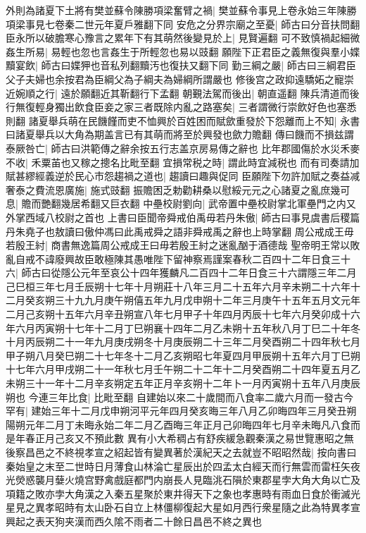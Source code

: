 外則為諸夏下土將有樊並蘇令陳勝項梁奮臂之禍|{
	樊並蘇令事見上卷永始三年陳勝項梁事見七卷秦二世元年夏戶雅翻下同}
安危之分界宗廟之至憂|{
	師古曰分音扶問翻}
臣永所以破膽寒心豫言之累年下有其萌然後變見於上|{
	見賢遍翻}
可不致慎禍起細微姦生所易|{
	易輕也忽也言姦生于所輕忽也易以豉翻}
願陛下正君臣之義無復與羣小媟黷宴飲|{
	師古曰媟狎也音私列翻黷汚也復扶又翻下同}
勤三綱之嚴|{
	師古曰三綱君臣父子夫婦也余按君為臣綱父為子綱夫為婦綱所謂嚴也}
修後宫之政抑遠驕妬之寵崇近婉順之行|{
	遠於願翻近其靳翻行下孟翻}
朝覲法駕而後出|{
	朝直遥翻}
陳兵清道而後行無復輕身獨出飲食臣妾之家三者既除内亂之路塞矣|{
	三者謂微行崇飲好色也塞悉則翻}
諸夏舉兵萌在民饑饉而吏不恤興於百姓困而賦歛重發於下怨離而上不知|{
	永書曰諸夏舉兵以大角為期盖言已有其萌而將至於興發也歛力贍翻}
傳曰饑而不損兹謂泰厥咎亡|{
	師古曰洪範傳之辭余按五行志盖京房易傳之辭也}
比年郡國傷於水災禾麥不收|{
	禾粟苖也又稼之摠名比毗至翻}
宜損常税之時|{
	謂此時宜減税也}
而有司奏請加賦甚繆經義逆於民心市怨趨禍之道也|{
	趨讀曰趣與促同}
臣願陛下勿許加賦之奏益减奢泰之費流恩廣施|{
	施式豉翻}
振贍困乏勅勸耕桑以慰綏元元之心諸夏之亂庶幾可息|{
	贍而艷翻幾居希翻又巨衣翻}
中壘校尉劉向|{
	武帝置中壘校尉掌北軍壘門之内又外掌西域八校尉之首也}
上書曰臣聞帝舜戒伯禹毋若丹朱傲|{
	師古曰事見虞書后稷篇丹朱堯子也敖讀曰傲仲馮曰此禹戒舜之語非舜戒禹之辭也上時掌翻}
周公戒成王毋若殷王紂|{
	商書無逸篇周公戒成王曰毋若殷王紂之迷亂酗于酒德哉}
聖帝明王常以敗亂自戒不諱廢興故臣敢極陳其愚唯陛下留神察焉謹案春秋二百四十二年日食三十六|{
	師古曰從隱公元年至哀公十四年獲麟凡二百四十二年日食三十六謂隱三年二月己巳桓三年七月壬辰朔十七年十月朔莊十八年三月二十五年六月辛未朔二十六年十二月癸亥朔三十九九月庚午朔僖五年九月戊申朔十二年三月庚午十五年五月文元年二月己亥朔十五年六月辛丑朔宣八年七月甲子十年四月丙辰十七年六月癸卯成十六年六月丙寅朔十七年十二月丁巳朔襄十四年二月乙未朔十五年秋八月丁巳二十年冬十月丙辰朔二十一年九月庚戌朔冬十月庚辰朔二十三年二月癸酉朔二十四年秋七月甲子朔八月癸巳朔二十七年冬十二月乙亥朔昭七年夏四月甲辰朔十五年六月丁巳朔十七年六月甲戌朔二十一年秋七月壬午朔二十二年十二月癸酉朔二十四年夏五月乙未朔三十一年十二月辛亥朔定五年正月辛亥朔十二年卜一月丙寅朔十五年八月庚辰朔也}
今連三年比食|{
	比毗至翻}
自建始以來二十歲間而八食率二歲六月而一發古今罕有|{
	建始三年十二月戊申朔河平元年四月癸亥晦三年八月乙卯晦四年三月癸丑朔陽朔元年二月丁未晦永始二年二月乙酉晦三年正月己卯晦四年七月辛未晦凡八食而是年春正月己亥又不預此數}
異有小大希稠占有舒疾緩急觀秦漢之易世覽惠昭之無後察昌邑之不終視孝宣之紹起皆有變異著於漢紀天之去就豈不昭昭然哉|{
	按向書曰秦始皇之末至二世時日月薄食山林淪亡星辰出於四孟太白經天而行無雲而雷枉矢夜光熒惑襲月㜸火燒宫野禽戲庭都門内崩長人見臨洮石隕於東郡星孛大角大角以亡及項籍之敗亦孛大角漢之入秦五星聚於東井得天下之象也孝惠時有雨血日食於衝滅光星見之異孝昭時有太山卧石自立上林僵柳復起大星如月西行衆星隨之此為特異孝宣興起之表天狗夹漢而西久隂不雨者二十餘日昌邑不終之異也}
